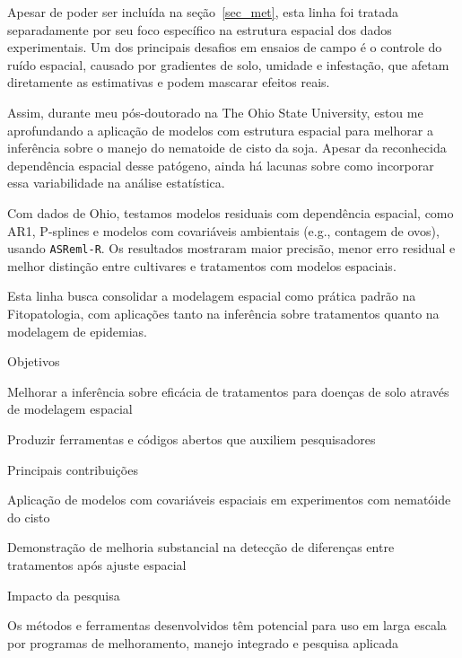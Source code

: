 \documentclass[12pt,a4paper,oneside]{book}
\newcommand{\OSU}{The Ohio State University}
\begin{document}
Apesar de poder ser incluída na seção~\ref{sec_met}, esta linha foi tratada separadamente por seu foco 
específico na estrutura espacial dos dados experimentais. Um dos principais desafios em ensaios de campo é o 
controle do ruído espacial, causado por gradientes de solo, umidade e infestação, que afetam 
diretamente as estimativas e podem mascarar efeitos reais.

Assim, durante meu pós-doutorado na \OSU{}, estou me aprofundando a aplicação de modelos com estrutura espacial para 
melhorar a inferência sobre o manejo do nematoide de cisto da soja. Apesar da reconhecida dependência espacial
desse patógeno, ainda há lacunas sobre como incorporar essa variabilidade na análise estatística.

Com dados de Ohio, testamos modelos residuais com dependência espacial, como AR1, P-splines e modelos com 
covariáveis ambientais (e.g., contagem de ovos), usando \texttt{ASReml-R}. Os resultados mostraram maior
precisão, menor erro residual e melhor distinção entre cultivares e tratamentos com modelos espaciais.

Esta linha busca consolidar a modelagem espacial como prática padrão na Fitopatologia, com aplicações 
tanto na inferência sobre tratamentos quanto na modelagem de epidemias.

\begin{fancyenum}{\faBullseye}{Objetivos}
\item Melhorar a inferência sobre eficácia de tratamentos para doenças de solo através de modelagem espacial
\item Produzir ferramentas e códigos abertos que auxiliem pesquisadores
\end{fancyenum}

\begin{fancyenum}{\faLightbulb}{Principais contribuições}
\item Aplicação de modelos com covariáveis espaciais em experimentos com nematóide do cisto
\item Demonstração de melhoria substancial na detecção de diferenças entre tratamentos após ajuste espacial
\end{fancyenum}

\begin{fancyenum}{\faRocket}{Impacto da pesquisa}
\item Os métodos e ferramentas desenvolvidos têm potencial para uso em larga 
escala por programas de melhoramento, manejo integrado e pesquisa aplicada
\end{fancyenum}
\end{document}
